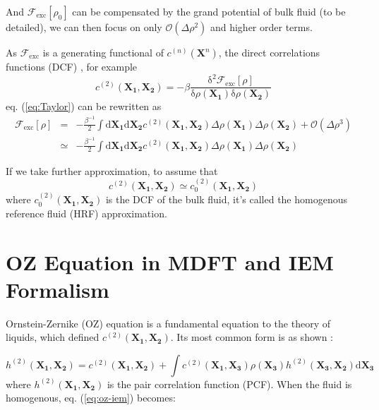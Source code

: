 And $\mathcal{F}_{\mathrm{exc}}\left[\rho_{0}\right]$ can be compensated
by the grand potential of bulk fluid (to be detailed), we can then
focus on only $\mathcal{O}(\Delta\rho^{2})$ and higher order terms.

As $\mathcal{F}_{\mathrm{exc}}$ is a generating functional of $c^{(n)}(\mathbf{X}^{n})$,
the direct correlations functions (DCF) \citep{Hensen-McDonald},
for example
\begin{equation}
c^{(2)}(\mathbf{X_{1}},\mathbf{X_{2}})=-\beta\frac{\mathrm{\delta}^{2}\mathcal{F}_{\mathrm{exc}}\left[\rho\right]}{\mathrm{\delta}\rho(\mathbf{X_{1}})\mathrm{\delta}\rho(\mathbf{X_{2}})}
\end{equation}
eq. (\ref{eq:Taylor}) can be rewritten as
\begin{eqnarray}
\mathcal{F}_{\mathrm{exc}}\left[\rho\right] & = & -\frac{\beta^{-1}}{2}\int\mathrm{d}\mathbf{X_{1}}\mathrm{d}\mathbf{X_{2}}c^{(2)}(\mathbf{X_{1}},\mathbf{X_{2}})\Delta\rho(\mathbf{X_{1}})\Delta\rho(\mathbf{X_{2}})+\mathcal{O}(\Delta\rho^{3})\nonumber \\
 & \simeq & -\frac{\beta^{-1}}{2}\int\mathrm{d}\mathbf{X_{1}}\mathrm{d}\mathbf{X_{2}}c^{(2)}(\mathbf{X_{1}},\mathbf{X_{2}})\Delta\rho(\mathbf{X_{1}})\Delta\rho(\mathbf{X_{2}})\label{eq:fexc-2nd-term}
\end{eqnarray}


If we take further approximation, to assume that
\begin{equation}
c^{(2)}(\mathbf{X_{1}},\mathbf{X_{2}})\simeq c_{0}^{(2)}(\mathbf{X_{1}},\mathbf{X_{2}})
\end{equation}
where $c_{0}^{(2)}(\mathbf{X_{1}},\mathbf{X_{2}})$ is the DCF of
the bulk fluid, it's called the homogenous reference fluid (HRF) approximation.


\section{OZ Equation in MDFT and IEM Formalism}

Ornstein-Zernike (OZ) equation is a fundamental equation to the theory
of liquids, which defined $c^{(2)}(\mathbf{X_{1}},\mathbf{X_{2}})$.
Its most common form is as shown \citep{Hensen-McDonald}:

\begin{equation}
h^{(2)}(\mathbf{X_{1}},\mathbf{X_{2}})=c^{(2)}(\mathbf{X_{1}},\mathbf{X_{2}})+\int c^{(2)}(\mathbf{X_{1}},\mathbf{X_{3}})\rho(\mathbf{X_{3}})h^{(2)}(\mathbf{X_{3}},\mathbf{X_{2}})\mathrm{d}\mathbf{X_{3}}\label{eq:oz-iem}
\end{equation}
where $h^{(2)}(\mathbf{X_{1}},\mathbf{X_{2}})$ is the pair correlation
function (PCF). When the fluid is homogenous, eq. (\ref{eq:oz-iem})
becomes:

